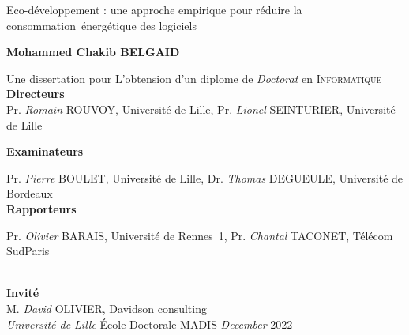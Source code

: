 \begin{center}
    \LARGE
    Eco-développement : une approche empirique pour réduire la consommation~énergétique des logiciels

    \vspace{.8cm}
    \Large
    \textbf{Mohammed Chakib \textsc{BELGAID}}
    \vspace{0.8cm}
    \large

    Une dissertation pour L'obtension d'un diplome de \emph{Doctorat} en \textsc{Informatique}  \\

    \large
    \textbf{Directeurs}\\
    \RaggedRight
    \vspace{.5cm}
    \normalsize
    Pr. \emph{Romain} \textsc{ROUVOY}, Université de Lille,\newline
    Pr. \emph{Lionel} \textsc{SEINTURIER}, Université de Lille
    \endminipage
    \vspace{0.6cm}

    \large
    \textbf{Examinateurs}\\
    \normalsize

    \vspace{.5cm}


    Pr. \emph{Pierre} \textsc{BOULET}, Université de Lille,\newline
    Dr. \emph{Thomas} \textsc{DEGUEULE}, Université de Bordeaux
    \endminipage
    \vspace{.5cm}
    \\
    \large
    \textbf{Rapporteurs}\\

    \vspace{.5cm}
    \normalsize
    Pr. \emph{Olivier} \textsc{BARAIS}, Université de Rennes~1,\newline
    Pr. \emph{Chantal} \textsc{TACONET}, Télécom SudParis

    \endminipage
    \vspace{0.6cm}
    \\
    \large
    \textbf{Invité}\\
    \normalsize
    \vspace{.5cm}
    M. \emph{David} OLIVIER, Davidson consulting
    \endminipage
    \vspace{0.8cm}
    \\
    \large
    \emph{Université de Lille}
    \'Ecole Doctorale MADIS
    \endminipage
    \emph{December} 2022
    \endminipage



\end{center}